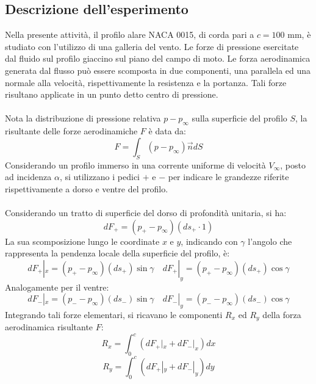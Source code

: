 \subsection{Descrizione dell'esperimento}
Nella presente attività, il profilo alare NACA 0015, di corda pari a $c=100$ mm, è studiato con l'utilizzo di una galleria del vento. Le forze di pressione esercitate dal fluido sul profilo giaccino sul piano del campo di moto. Le forza aerodinamica generata dal flusso può essere scomposta in due componenti, una parallela ed una normale alla velocità, rispettivamente la resistenza e la portanza. Tali forze risultano applicate in un punto detto centro di pressione.\\\\
Nota la distribuzione di pressione relativa $p-p_\infty$ sulla superficie del profilo $S$, la risultante delle forze aerodinamiche $F$ è data da:
\begin{equation*}
    F = \int_S (p-p_\infty)\vec n dS
\end{equation*}
Considerando un profilo immerso in una corrente uniforme di velocità $V_\infty$, posto ad incidenza $\alpha$, si utilizzano i pedici $+$ e $-$ per indicare le grandezze riferite rispettivamente a dorso e ventre del profilo.\\\\
Considerando un tratto di superficie del dorso di profondità unitaria, si ha:
\begin{equation*}
    dF_+ = (p_+ - p_\infty)(ds_+ \cdot 1)
\end{equation*}
La sua scomposizione lungo le coordinate $x$ e $y$, indicando con $\gamma$ l'angolo che rappresenta la pendenza locale della superficie del profilo, è:
\begin{equation*}
    dF_+|_x = (p_+ - p_\infty)(ds_+)\sin \gamma \quad dF_+|_y = (p_+ - p_\infty)(ds_+)\cos \gamma
\end{equation*}
Analogamente per il ventre:
\begin{equation*}
    dF_-|_x = (p_- - p_\infty)(ds_-)\sin \gamma \quad dF_-|_y = (p_- - p_\infty)(ds_-)\cos \gamma
\end{equation*}
Integrando tali forze elementari, si ricavano le componenti $R_x$ ed $R_y$ della forza aerodinamica risultante $F$:
\begin{equation*}
    R_x = \int_0^c (dF_+|_x + dF_-|_x)dx
\end{equation*}
\begin{equation*}
    R_y = \int_0^c (dF_+|_y + dF_-|_y)dy
\end{equation*}
